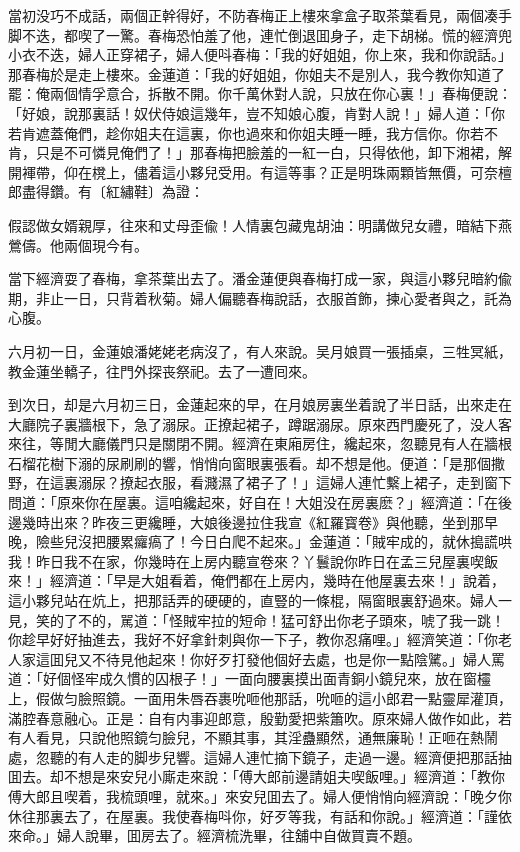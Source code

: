 當初没巧不成話，兩個正幹得好，不防春梅正上樓來拿盒子取茶葉看見，兩個凑手脚不迭，都喫了一驚。春梅恐怕羞了他，連忙倒退囬身子，走下胡梯。慌的經濟兜小衣不迭，婦人正穿裙子，婦人便呌春梅：「我的好姐姐，你上來，我和你說話。」那春梅於是走上樓來。金蓮道：「我的好姐姐，你姐夫不是別人，我今教你知道了罷：俺兩個情孚意合，拆散不開。你千萬休對人說，只放在你心裏！」春梅便說：「好娘，說那裏話！奴伏侍娘這幾年，豈不知娘心腹，肯對人說！」婦人道：「你若肯遮蓋俺們，趁你姐夫在這裏，你也過來和你姐夫睡一睡，我方信你。你若不肯，只是不可憐見俺們了！」那春梅把臉羞的一紅一白，只得依他，卸下湘裙，解開褌帶，仰在櫈上，儘着這小夥兒受用。有這等事？正是明珠兩顆皆無價，可奈檀郎盡得鑽。有〔紅繡鞋〕為證：

\begin{myquote}
假認做女婿親厚，往來和丈母歪偸！人情裏包藏鬼胡油：明講做兒女禮，暗結下燕鶯儔。他兩個現今有。
\end{myquote}

當下經濟耍了春梅，拿茶葉出去了。潘金蓮便與春梅打成一家，與這小夥兒暗約偸期，非止一日，只背着秋菊。婦人偏聽春梅說話，衣服首飾，揀心愛者與之，託為心腹。

六月初一日，金蓮娘潘姥姥老病沒了，有人來說。吴月娘買一張插桌，三牲冥紙，教金蓮坐轎子，往門外探丧祭祀。去了一遭囘來。

到次日，却是六月初三日，金蓮起來的早，在月娘房裏坐着說了半日話，出來走在大廳院子裏牆根下，急了溺尿。正撩起裙子，蹲踞溺尿。原來西門慶死了，没人客來往，等閒大廳儀門只是關閉不開。經濟在東廂房住，纔起來，忽聽見有人在牆根石榴花樹下溺的尿刷刷的響，悄悄向窗眼裏張看。却不想是他。便道：「是那個撒野，在這裏溺尿？撩起衣服，看濺濕了裙子了！」這婦人連忙繫上裙子，走到窗下問道：「原來你在屋裏。這咱纔起來，好自在！大姐没在房裏麽？」經濟道：「在後邊幾時出來？昨夜三更纔睡，大娘後邊拉住我宣《紅羅寳卷》與他聽，坐到那早晚，險些兒沒把腰累㿚瘑了！今日白爬不起來。」金蓮道：「賊牢成的，就休搗謊哄我！昨日我不在家，你幾時在上房内聽宣卷來？丫鬟說你昨日在孟三兒屋裏喫飯來！」經濟道：「早是大姐看着，俺們都在上房内，幾時在他屋裏去來！」說着，這小夥兒站在炕上，把那話弄的硬硬的，直豎的一條棍，隔窗眼裏舒過來。婦人一見，笑的了不的，駡道：「怪賊牢拉的短命！猛可舒出你老子頭來，唬了我一跳！你趁早好好抽進去，我好不好拿針刺與你一下子，教你忍痛哩。」經濟笑道：「你老人家這囬兒又不待見他起來！你好歹打發他個好去處，也是你一點陰騭。」婦人罵道：「好個怪牢成久慣的囚根子！」一面向腰裏摸出面青銅小鏡兒來，放在窗欞上，假做匀臉照鏡。一面用朱唇吞裹吮咂他那話，吮咂的這小郎君一點靈犀灌頂，滿腔春意融心。正是：自有内事迎郎意，殷勤愛把紫簫吹。原來婦人做作如此，若有人看見，只說他照鏡匀臉兒，不顯其事，其淫蠱顯然，通無廉恥！正咂在熱鬧處，忽聽的有人走的脚步兒響。這婦人連忙摘下鏡子，走過一邊。經濟便把那話抽囬去。却不想是來安兒小廝走來說：「傅大郎前邊請姐夫喫飯哩。」經濟道：「教你傅大郎且喫着，我梳頭哩，就來。」來安兒囬去了。婦人便悄悄向經濟說：「晚夕你休往那裏去了，在屋裏。我使春梅呌你，好歹等我，有話和你說。」經濟道：「謹依來命。」婦人說畢，囬房去了。經濟梳洗畢，往舖中自做買賣不題。

